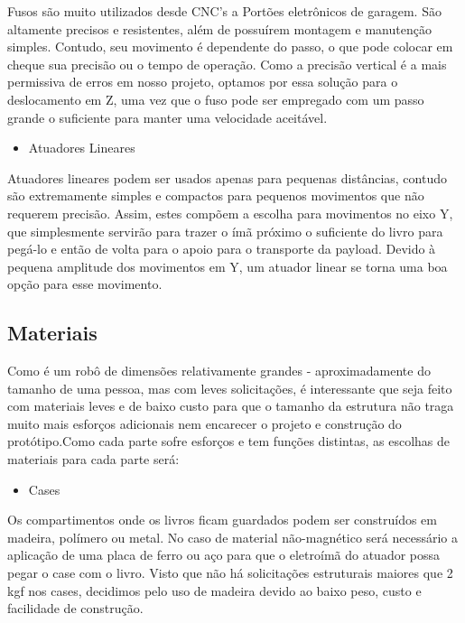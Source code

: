 Fusos são muito utilizados desde CNC’s a Portões eletrônicos de garagem. São altamente precisos e resistentes, além de possuírem montagem e manutenção simples. Contudo, seu movimento é dependente do passo, o que pode colocar em cheque sua precisão ou o tempo de operação. Como a precisão vertical é a mais permissiva de erros em nosso projeto, optamos por essa solução para o deslocamento em Z, uma vez que o fuso pode ser empregado com um passo grande o suficiente para manter uma velocidade aceitável.

\begin{itemize}
\item{Atuadores Lineares}
\end{itemize}

Atuadores lineares podem ser usados apenas para pequenas distâncias, contudo são extremamente simples e compactos para pequenos movimentos que não requerem precisão. Assim, estes compõem a escolha para movimentos no eixo Y, que simplesmente servirão para trazer o ímã próximo o suficiente do livro para pegá-lo e então de volta para o apoio para o transporte da payload. Devido à pequena amplitude dos movimentos em Y, um atuador linear se torna uma boa opção para esse movimento.

\subsection{Materiais}

Como é um robô de dimensões relativamente grandes - aproximadamente do tamanho de uma pessoa, mas com leves solicitações, é interessante que seja feito com materiais leves e de baixo custo para que o tamanho da estrutura não traga muito mais esforços adicionais nem encarecer o projeto e construção do protótipo.Como cada parte sofre esforços e tem funções distintas, as escolhas de materiais para cada parte será:

\begin{itemize}
\item{Cases}
\end{itemize}

Os compartimentos onde os livros ficam guardados podem ser construídos em madeira, polímero ou metal. No caso de material não-magnético será necessário a aplicação de uma placa de ferro ou aço para que o eletroímã do atuador possa pegar o case com o livro. Visto que não há solicitações estruturais maiores que 2 kgf nos cases, decidimos pelo uso de madeira devido ao baixo peso, custo e facilidade de construção.

